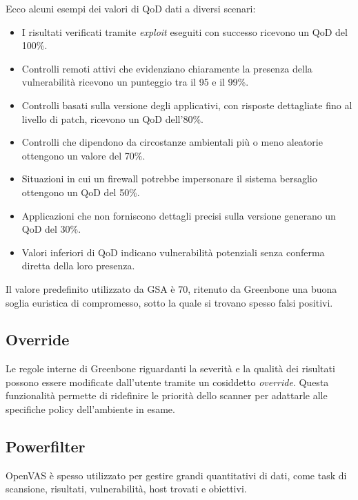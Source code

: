 Ecco alcuni esempi dei valori di QoD dati a diversi scenari:
\begin{itemize}
    \item I risultati verificati tramite \emph{exploit} eseguiti con successo ricevono un QoD del 100\%.
    \item Controlli remoti attivi che evidenziano chiaramente la presenza della vulnerabilità ricevono un punteggio tra il 95 e il 99\%.
    \item Controlli basati sulla versione degli applicativi, con risposte dettagliate fino al livello di patch, ricevono un QoD dell'80\%.
    \item Controlli che dipendono da circostanze ambientali più o meno aleatorie ottengono un valore del 70\%.
    \item Situazioni in cui un firewall potrebbe impersonare il sistema bersaglio ottengono un QoD del 50\%.
    \item Applicazioni che non forniscono dettagli precisi sulla versione generano un QoD del 30\%.
    \item Valori inferiori di QoD indicano vulnerabilità potenziali senza conferma diretta della loro presenza.
\end{itemize}

Il valore predefinito utilizzato da GSA è 70, ritenuto da Greenbone una buona soglia euristica di compromesso, sotto la quale si trovano spesso falsi positivi.

\subsection{Override}
\label{override}
Le regole interne di Greenbone riguardanti la severità e la qualità dei risultati possono essere modificate dall'utente tramite un cosiddetto \emph{override}. Questa funzionalità permette di ridefinire le priorità dello scanner per adattarle alle specifiche policy dell'ambiente in esame.

\subsection{Powerfilter}
\label{powerfilter}
OpenVAS è spesso utilizzato per gestire grandi quantitativi di dati, come task di scansione, risultati, vulnerabilità, host trovati e obiettivi.

